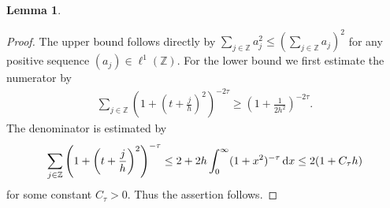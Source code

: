 \documentclass{article}
\renewcommand{\d}{\, \textup{d}}
\newtheorem{lemma}[theorem]{Lemma}
\newcommand{\Z}{\mathbb{Z}}
\begin{document}
\begin{appendices}
\begin{lemma}
\end{lemma}
\begin{proof}
       The upper bound follows directly by $\sum_{j \in \Z} a_j^2 \leq \left( \sum_{j \in \Z} a_j\right)^2$ for any positive sequence $(a_j) \in \ell^1(\Z)$. 
           For the lower bound we first estimate the numerator by 
    \begin{align*}
      \sum_{j \in \Z} \left(1+\left(t+\frac{j}{h}\right)^2\right)^{-2\tau} \geq \left( 1+ \frac{1}{2h^2} \right)^{-2\tau}. 
    \end{align*} 
        The denominator is estimated by 
    \begin{align*}
     \sum_{j \in \Z} \left( 1+\left(t+\frac{j}{h}\right)^2\right)^{-\tau} \leq 2 + 2h \int_0^\infty (1+x^2)^{-\tau} \d x \leq 2(1+C_\tau h)
    \end{align*}
    for some constant $C_\tau >0$. Thus the assertion follows.
\end{proof}


\end{appendices}
\end{document}
